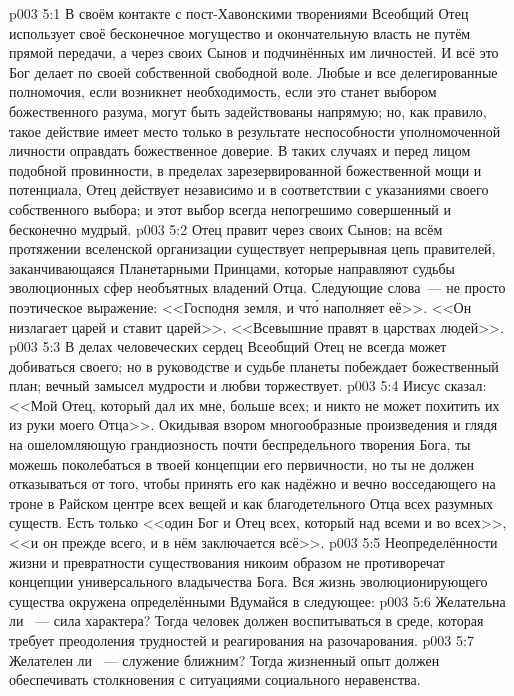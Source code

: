 \vs p003 5:1 В своём контакте с пост\hyp{}Хавонскими творениями Всеобщий Отец использует своё бесконечное могущество и окончательную власть не путём прямой передачи, а через своих Сынов и подчинённых им личностей. И всё это Бог делает по своей собственной свободной воле. Любые и все делегированные полномочия, если возникнет необходимость, если это станет выбором божественного разума, могут быть задействованы напрямую; но, как правило, такое действие имеет место только в результате неспособности уполномоченной личности оправдать божественное доверие. В таких случаях и перед лицом подобной провинности, в пределах зарезервированной божественной мощи и потенциала, Отец действует независимо и в соответствии с указаниями своего собственного выбора; и этот выбор всегда непогрешимо совершенный и бесконечно мудрый.
\vs p003 5:2 Отец правит через своих Сынов; на всём протяжении вселенской организации существует непрерывная цепь правителей, заканчивающаяся Планетарными Принцами, которые направляют судьбы эволюционных сфер необъятных владений Отца. Следующие слова~--- не просто поэтическое выражение: <<Господня земля, и чт\'о наполняет её>>. <<Он низлагает царей и ставит царей>>. <<Всевышние правят в царствах людей>>.
\vs p003 5:3 В делах человеческих сердец Всеобщий Отец не всегда может добиваться своего; но в руководстве и судьбе планеты побеждает божественный план; вечный замысел мудрости и любви торжествует.
\vs p003 5:4 Иисус сказал: <<Мой Отец, который дал их мне, больше всех; и никто не может похитить их из руки моего Отца>>. Окидывая взором многообразные произведения и глядя на ошеломляющую грандиозность почти беспредельного творения Бога, ты можешь поколебаться в твоей концепции его первичности, но ты не должен отказываться от того, чтобы принять его как надёжно и вечно восседающего на троне в Райском центре всех вещей и как благодетельного Отца всех разумных существ. Есть только <<один Бог и Отец всех, который над всеми и во всех>>, <<и он прежде всего, и в нём заключается всё>>.
\vs p003 5:5 \pc Неопределённости жизни и превратности существования никоим образом не противоречат концепции универсального владычества Бога. Вся жизнь эволюционирующего существа окружена определёнными  Вдумайся в следующее:
\vs p003 5:6 Желательна ли ~--- сила характера? Тогда человек должен воспитываться в среде, которая требует преодоления трудностей и реагирования на разочарования.
\vs p003 5:7 Желателен ли ~--- служение ближним? Тогда жизненный опыт должен обеспечивать столкновения с ситуациями социального неравенства.
